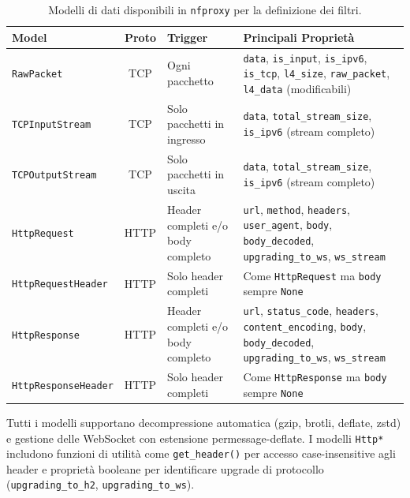 \renewcommand{\arraystretch}{1.3}
\begin{table}[H]
    \centering
    \footnotesize
    \begin{tabular}{|l|c|p{3.5cm}|p{6cm}|}
        \hline
        \textbf{Model} & \textbf{Proto} & \textbf{Trigger} & \textbf{Principali Proprietà} \\
        \hline
        \texttt{RawPacket} & TCP & Ogni pacchetto & 
        \texttt{data}, \texttt{is\_input}, \texttt{is\_ipv6}, \texttt{is\_tcp}, \texttt{l4\_size}, \texttt{raw\_packet}, \texttt{l4\_data} (modificabili) \\
        \hline
        \texttt{TCPInputStream} & TCP & Solo pacchetti in ingresso & 
        \texttt{data}, \texttt{total\_stream\_size}, \texttt{is\_ipv6} (stream completo) \\
        \hline
        \texttt{TCPOutputStream} & TCP & Solo pacchetti in uscita & 
        \texttt{data}, \texttt{total\_stream\_size}, \texttt{is\_ipv6} (stream completo) \\
        \hline
        \texttt{HttpRequest} & HTTP & Header completi e/o body completo & 
        \texttt{url}, \texttt{method}, \texttt{headers}, \texttt{user\_agent}, \texttt{body}, \texttt{body\_decoded}, \texttt{upgrading\_to\_ws}, \texttt{ws\_stream} \\
        \hline
        \texttt{HttpRequestHeader} & HTTP & Solo header completi & 
        Come \texttt{HttpRequest} ma \texttt{body} sempre \texttt{None} \\
        \hline
        \texttt{HttpResponse} & HTTP & Header completi e/o body completo & 
        \texttt{url}, \texttt{status\_code}, \texttt{headers}, \texttt{content\_encoding}, \texttt{body}, \texttt{body\_decoded}, \texttt{upgrading\_to\_ws}, \texttt{ws\_stream} \\
        \hline
        \texttt{HttpResponseHeader} & HTTP & Solo header completi & 
        Come \texttt{HttpResponse} ma \texttt{body} sempre \texttt{None} \\
        \hline
    \end{tabular}
    \caption{Modelli di dati disponibili in \texttt{nfproxy} per la definizione dei filtri.}\label{tab:nfproxy_datahandlers}
\end{table}
\renewcommand{\arraystretch}{1}

Tutti i modelli supportano decompressione automatica (gzip, brotli, deflate, zstd) e gestione delle WebSocket con estensione permessage-deflate. I modelli \texttt{Http*} includono funzioni di utilità come \texttt{get\_header()} per accesso case-insensitive agli header e proprietà booleane per identificare upgrade di protocollo (\texttt{upgrading\_to\_h2}, \texttt{upgrading\_to\_ws}).

